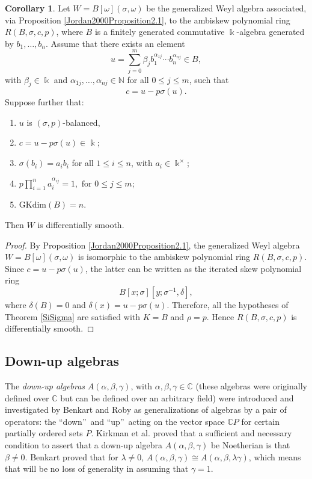 \documentclass{amsart}
\theoremstyle{definition}
\newtheorem{corollary}[theorem]{Corollary}
\theoremstyle{remark}
\numberwithin{equation}{section}
\begin{document}
\begin{corollary}\label{GWASiSigma}
Let $W=B[\omega](\sigma,\omega)$ be the generalized Weyl algebra associated, via Proposition \ref{Jordan2000Proposition2.1}, to the ambiskew polynomial ring $R(B,\sigma,c,p)$, where $B$ is a finitely generated commutative $\Bbbk$-algebra generated by $b_1,\dots,b_n$. Assume that there exists an element
$$
u=\sum_{j=0}^{m}\beta_j b_1^{\alpha_{1j}}\cdots b_n^{\alpha_{nj}}\in B,
$$
with $\beta_j\in\Bbbk$ and $\alpha_{1j},\dots,\alpha_{nj}\in\mathbb{N}$ for all $0\leq j\leq m$, such that
$$
c=u-p\sigma(u).
$$
Suppose further that:
\begin{enumerate}
    \item[\rm (1)] $u$ is $(\sigma,p)$-balanced,
    \item[\rm (2)] $c=u-p\sigma(u)\in \Bbbk$;
    \item[\rm (3)] $\sigma(b_i)=a_i b_i$ for all $1\leq i\leq n$, with $a_i\in \Bbbk^\times$;
    \item[\rm (4)] $\displaystyle p\prod_{i=1}^{n}a_i^{\alpha_{ij}}=1,\text{ for } 0\leq j\leq m$;
    \item[\rm (5)] $\text{GKdim}(B)=n$.
\end{enumerate}
Then $W$ is differentially smooth.
\end{corollary}

\begin{proof}
By Proposition \ref{Jordan2000Proposition2.1}, the generalized Weyl algebra $W=B[\omega](\sigma,\omega)$ is isomorphic to the ambiskew polynomial ring $R(B,\sigma,c,p)$. Since $c=u-p\sigma(u)$, the latter can be written as the iterated skew polynomial ring
$$
B[x;\sigma][y;\sigma^{-1},\delta],
$$
where $\delta(B)=0$ and $\delta(x)=u-p\sigma(u)$. Therefore, all the hypotheses of Theorem \ref{SiSigma} are satisfied with $K=B$ and $\rho=p$. Hence $R(B,\sigma,c,p)$ is differentially smooth.
\end{proof}

\subsection{Down-up algebras}\label{DownupalgebrasBenkartRoby1998}

The {\em down-up algebras} $A(\alpha, \beta, \gamma)$, with $\alpha, \beta, \gamma \in \mathbb{C}$ (these algebras were originally defined over $\mathbb{C}$ but can be defined over an arbitrary field) were introduced and investigated by Benkart and Roby \cite{Benkart1998, BenkartRoby1998} as generalizations of algebras by a pair of operators: the \textquotedblleft down\textquotedblright\, and \textquotedblleft up\textquotedblright\, acting on the vector space $\mathbb{C}P$ for certain partially ordered sets $P$. Kirkman et al. \cite{Kirkmanetal1999} proved that a sufficient and necessary condition to assert that a down-up algebra $A(\alpha, \beta, \gamma)$ be Noetherian is that $\beta \neq 0$. Benkart \cite{Benkart1998} proved that for $\lambda \neq 0$, $A(\alpha, \beta, \gamma) \cong A(\alpha, \beta, \lambda \gamma)$, which means that will be no loss of generality in assuming that $\gamma = 1$.
\end{document}
